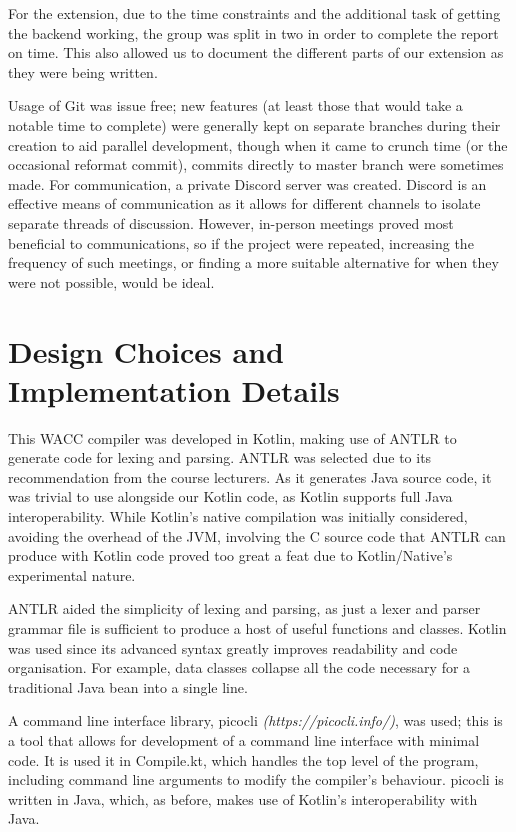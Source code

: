\documentclass{article}
\begin{document}
For the extension, due to the time constraints and the additional task of getting the backend working, the group was split in two in order to complete the report on time. This also allowed us to document the different parts of our extension as they were being written.

Usage of Git was issue free; new features (at least those that would take a notable time to complete) were generally kept on separate branches during their creation to aid parallel development, though when it came to crunch time (or the occasional reformat commit), commits directly to master branch were sometimes made. For communication, a private Discord server was created. Discord is an effective means of communication as it allows for different channels to isolate separate threads of discussion. However, in-person meetings proved most beneficial to communications, so if the project were repeated, increasing the frequency of such meetings, or finding a more suitable alternative for when they were not possible, would be ideal.


\section{Design Choices and Implementation Details}

This WACC compiler was developed in Kotlin, making use of ANTLR to generate code for lexing and parsing. ANTLR was selected due to its recommendation from the course lecturers. As it generates Java source code, it was trivial to use alongside our Kotlin code, as Kotlin supports full Java interoperability. While Kotlin's native compilation was initially considered, avoiding the overhead of the JVM, involving the C source code that ANTLR can produce with Kotlin code proved too great a feat due to Kotlin/Native's experimental nature.

ANTLR aided the simplicity of lexing and parsing, as just a lexer and parser grammar file is sufficient to produce a host of useful functions and classes. Kotlin was used since its advanced syntax greatly improves readability and code organisation. For example, data classes collapse all the code necessary for a traditional Java bean into a single line.

A command line interface library, picocli \textit{(https://picocli.info/)}, was used; this is a tool that allows for development of a command line interface with minimal code. It is used it in Compile.kt, which handles the top level of the program, including command line arguments to modify the compiler's behaviour. picocli is written in Java, which, as before, makes use of Kotlin's interoperability with Java.
\end{document}
